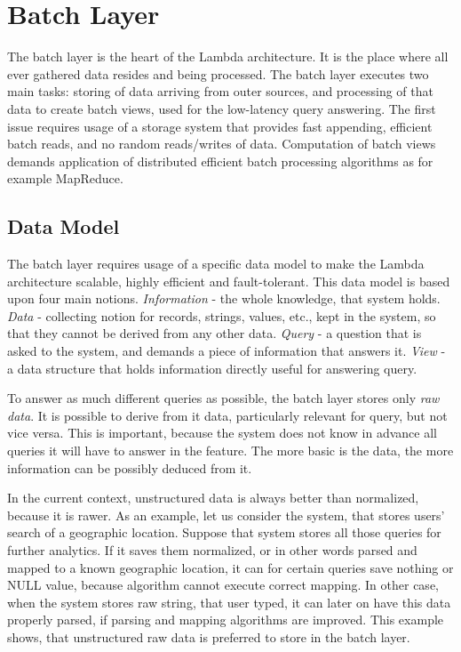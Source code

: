 \section{Batch Layer}

The batch layer is the heart of the Lambda architecture.
It is the place where all ever gathered data resides and being processed.
The batch layer executes two main tasks: storing of data arriving from outer sources, and processing of that data to create batch views, used for the low-latency query answering.
The first issue requires usage of a storage system that provides fast appending, efficient batch reads, and no random reads/writes of data.
Computation of batch views demands application of distributed efficient batch processing algorithms as for example MapReduce.

\subsection{Data Model}

The batch layer requires usage of a specific data model to make the Lambda architecture scalable, highly efficient and fault-tolerant.
This data model is based upon four main notions.
\textit{Information} - the whole knowledge, that system holds.
\textit{Data} - collecting notion for records, strings, values, etc., kept in the system, so that they cannot be derived from any other data.
\textit{Query} - a question that is asked to the system, and demands a piece of information that answers it.
\textit{View} - a data structure that holds information directly useful for answering query.

To answer as much different queries as possible, the batch layer stores only \textit{raw data}.
It is possible to derive from it data, particularly relevant for query, but not vice versa.
This is important, because the system does not know in advance all queries it will have to answer in the feature.
The more basic is the data, the more information can be possibly deduced from it.

In the current context, unstructured data is always better than normalized, because it is rawer.
As an example, let us consider the system, that stores users' search of a geographic location.
Suppose that system stores all those queries for further analytics.
If it saves them normalized, or in other words parsed and mapped to a known geographic location, it can for certain queries save nothing or NULL value, because algorithm cannot execute correct mapping.
In other case, when the system stores raw string, that user typed, it can later on have this data properly parsed, if parsing and mapping algorithms are improved.
This example shows, that unstructured raw data is preferred to store in the batch layer.

